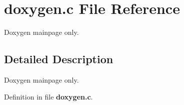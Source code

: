 \section{doxygen.\-c \-File \-Reference}
\label{doxygen_8c}


\-Doxygen mainpage only.  




\subsection{\-Detailed \-Description}
\-Doxygen mainpage only. 

\-Definition in file {\bf doxygen.\-c}.

